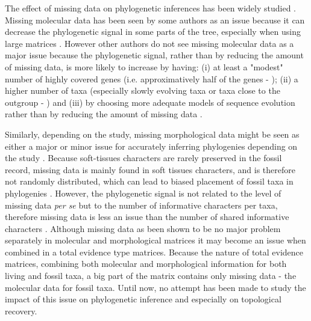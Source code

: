 \documentclass[12pt,letterpaper]{article}
\begin{document}
The effect of missing data on phylogenetic inferences has been widely studied \citep{wiensmissing2003,wiensmissing2006,wiensmissing2008,lemmonthe2009,rouresite-specific2011,sansomfossilization2013}.
Missing molecular data has been seen by some authors as an issue because it can decrease the phylogenetic signal in some parts of the tree, especially when using large matrices \citep{lemmonthe2009}.
However other authors do not see missing molecular data as a major issue because the phylogenetic signal, rather than by reducing the amount of missing data, is more likely to increase by having:
(i) at least a "modest" number of highly covered genes (i.e. approximatively half of the genes - \citet{rouresite-specific2011});
(ii) a higher number of taxa (especially slowly evolving taxa or taxa close to the outgroup - \citet{rouresite-specific2011}) and
(iii) by choosing more adequate models of sequence evolution rather than by reducing the amount of missing data \citep{wiensmissing2006,wiensmissing2008,rouresite-specific2011}.

Similarly, depending on the study, missing morphological data might be seen as either a major or minor issue for accurately inferring phylogenies depending on the study \citep{wiensmissing2003,sansomfossilization2013}.
Because soft-tissues characters are rarely preserved in the fossil record, missing data is mainly found in soft tissues characters, and is therefore not randomly distributed, which can lead to biased placement of fossil taxa in phylogenies \citep{sansomfossilization2013}.
However, the phylogenetic signal is not related to the level of missing data \textit{per se} but to the number of informative characters per taxa, therefore missing data is less an issue than the number of shared informative characters \citep{wiensmissing2003}.
Although missing data as been shown to be no major problem separately in molecular and morphological matrices \citep{wiensmissing2003,wiensmissing2006,wiensmissing2008,rouresite-specific2011} it may become an issue when combined in a total evidence type matrices.
Because the nature of total evidence matrices, combining both molecular and morphological information for both living and fossil taxa, a big part of the matrix contains only missing data - the molecular data for fossil taxa.
Until now, no attempt has been made to study the impact of this issue on phylogenetic inference and especially on topological recovery.
\end{document}
